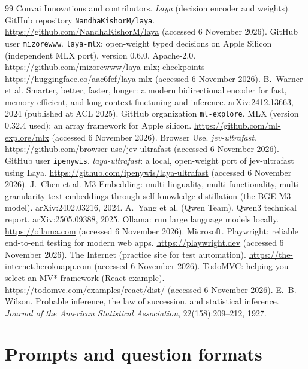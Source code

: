 \documentclass[11pt,a4paper]{article}
\begin{document}
\begin{thebibliography}{99}\small
{} Convai Innovations and contributors. \emph{Laya} (decision encoder and weights). GitHub repository \texttt{NandhaKishorM/laya}. \url{https://github.com/NandhaKishorM/laya} (accessed 6 November 2026).
 GitHub user \texttt{mizorewww}. \texttt{laya-mlx}: open-weight typed decisions on Apple Silicon (independent MLX port), version 0.6.0, Apache-2.0. \url{https://github.com/mizorewww/laya-mlx}; checkpoints \url{https://huggingface.co/aac6fef/laya-mlx} (accessed 6 November 2026).
 B.~Warner et al. Smarter, better, faster, longer: a modern bidirectional encoder for fast, memory efficient, and long context finetuning and inference. arXiv:2412.13663, 2024 (published at ACL 2025).
 GitHub organization \texttt{ml-explore}. MLX (version 0.32.4 used): an array framework for Apple silicon. \url{https://github.com/ml-explore/mlx} (accessed 6 November 2026).
 Browser Use. \emph{jev-ultrafast}. \url{https://github.com/browser-use/jev-ultrafast} (accessed 6 November 2026).
 GitHub user \texttt{ipenywis}. \emph{laya-ultrafast}: a local, open-weight port of jev-ultrafast using Laya. \url{https://github.com/ipenywis/laya-ultrafast} (accessed 6 November 2026).
 J.~Chen et al. M3-Embedding: multi-linguality, multi-functionality, multi-granularity text embeddings through self-knowledge distillation (the BGE-M3 model). arXiv:2402.03216, 2024.
 A.~Yang et al. (Qwen Team). Qwen3 technical report. arXiv:2505.09388, 2025.
 Ollama: run large language models locally. \url{https://ollama.com} (accessed 6 November 2026).
 Microsoft. Playwright: reliable end-to-end testing for modern web apps. \url{https://playwright.dev} (accessed 6 November 2026).
 The Internet (practice site for test automation). \url{https://the-internet.herokuapp.com} (accessed 6 November 2026).
 TodoMVC: helping you select an MV* framework (React example). \url{https://todomvc.com/examples/react/dist/} (accessed 6 November 2026).
 E.~B. Wilson. Probable inference, the law of succession, and statistical inference. \emph{Journal of the American Statistical Association}, 22(158):209--212, 1927.
\end{thebibliography}

\appendix
\section{Prompts and question formats}\label{app:prompts}
\end{document}
